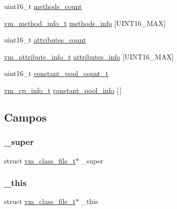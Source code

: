 \begin{DoxyCompactItemize}
\item 
uint16\+\_\+t \hyperlink{structvm__class__file__t_acf3d618060eb10392a8629829bc0f2f9}{methods\+\_\+count}
\item 
\hyperlink{structvm__method__info__t}{vm\+\_\+method\+\_\+info\+\_\+t} \hyperlink{structvm__class__file__t_a8474c1b1810c571af9c48b7bf25130d6}{methods\+\_\+info} \mbox{[}U\+I\+N\+T16\+\_\+\+M\+AX\mbox{]}
\item 
uint16\+\_\+t \hyperlink{structvm__class__file__t_abc7a986c0709f9444a0d162221d9a4d3}{attributes\+\_\+count}
\item 
\hyperlink{structvm__attribute__info__t}{vm\+\_\+attribute\+\_\+info\+\_\+t} \hyperlink{structvm__class__file__t_a027b4cde5400024c492106a95d085c31}{attributes\+\_\+info} \mbox{[}U\+I\+N\+T16\+\_\+\+M\+AX\mbox{]}
\item 
uint16\+\_\+t \hyperlink{structvm__class__file__t_a3e1c80fc4c5e5c5318bd4ae7f9eda777}{constant\+\_\+pool\+\_\+count\+\_\+t}
\item 
\hyperlink{structvm__cp__info__t}{vm\+\_\+cp\+\_\+info\+\_\+t} \hyperlink{structvm__class__file__t_a6e73a5057141aa12094442839bb23e57}{constant\+\_\+pool\+\_\+info} \mbox{[}$\,$\mbox{]}
\end{DoxyCompactItemize}


\subsection{Campos}
\mbox{\label{structvm__class__file__t_a0b23f45633db2488ed97706fecc53d79}} 
\subsubsection{\texorpdfstring{\+\_\+super}{\_super}}
{\footnotesize\ttfamily struct \hyperlink{structvm__class__file__t}{vm\+\_\+class\+\_\+file\+\_\+t}$\ast$ \+\_\+super}

\mbox{\label{structvm__class__file__t_a4b74ed82375e295745f93be94c0ee844}} 
\subsubsection{\texorpdfstring{\+\_\+this}{\_this}}
{\footnotesize\ttfamily struct \hyperlink{structvm__class__file__t}{vm\+\_\+class\+\_\+file\+\_\+t}$\ast$ \+\_\+this}

